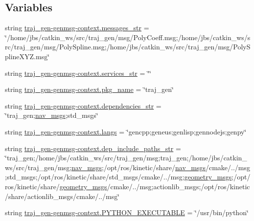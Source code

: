 \subsection*{Variables}
\begin{DoxyCompactItemize}
\item 
string \hyperlink{namespacetraj__gen-genmsg-context_aa35e0362011f87c9efa81944ad02a72c}{traj\+\_\+gen-\/genmsg-\/context.\+messages\+\_\+str} = \char`\"{}/home/jbs/catkin\+\_\+ws/src/traj\+\_\+gen/msg/Poly\+Coeff.\+msg;/home/jbs/catkin\+\_\+ws/src/traj\+\_\+gen/msg/Poly\+Spline.\+msg;/home/jbs/catkin\+\_\+ws/src/traj\+\_\+gen/msg/Poly\+Spline\+X\+Y\+Z.\+msg\char`\"{}
\item 
string \hyperlink{namespacetraj__gen-genmsg-context_a61b5ee79b98f6990ece4339523c314cd}{traj\+\_\+gen-\/genmsg-\/context.\+services\+\_\+str} = \char`\"{}\char`\"{}
\item 
string \hyperlink{namespacetraj__gen-genmsg-context_ab5dc5dad70851fcfb8bd37f81a8f57e1}{traj\+\_\+gen-\/genmsg-\/context.\+pkg\+\_\+name} = \char`\"{}traj\+\_\+gen\char`\"{}
\item 
string \hyperlink{namespacetraj__gen-genmsg-context_a417c691ecce226ef2afe434ec5853bcf}{traj\+\_\+gen-\/genmsg-\/context.\+dependencies\+\_\+str} = \char`\"{}traj\+\_\+gen;\hyperlink{_spline_gen_8js_a1fa5a20fd50395f7b988c134be2a3d32}{nav\+\_\+msgs};std\+\_\+msgs\char`\"{}
\item 
string \hyperlink{namespacetraj__gen-genmsg-context_aca02eb8fb1f15eb63943df387811ddd1}{traj\+\_\+gen-\/genmsg-\/context.\+langs} = \char`\"{}gencpp;geneus;genlisp;gennodejs;genpy\char`\"{}
\item 
string \hyperlink{namespacetraj__gen-genmsg-context_abb5ac73d6c4fb1f9bd9518957d727d36}{traj\+\_\+gen-\/genmsg-\/context.\+dep\+\_\+include\+\_\+paths\+\_\+str} = \char`\"{}traj\+\_\+gen;/home/jbs/catkin\+\_\+ws/src/traj\+\_\+gen/msg;traj\+\_\+gen;/home/jbs/catkin\+\_\+ws/src/traj\+\_\+gen/msg;\hyperlink{_spline_gen_8js_a1fa5a20fd50395f7b988c134be2a3d32}{nav\+\_\+msgs};/opt/ros/kinetic/share/\hyperlink{_spline_gen_8js_a1fa5a20fd50395f7b988c134be2a3d32}{nav\+\_\+msgs}/cmake/../msg;std\+\_\+msgs;/opt/ros/kinetic/share/std\+\_\+msgs/cmake/../msg;\hyperlink{_spline_gen_8js_a57147b325f221018e8a885cfdabacab8}{geometry\+\_\+msgs};/opt/ros/kinetic/share/\hyperlink{_spline_gen_8js_a57147b325f221018e8a885cfdabacab8}{geometry\+\_\+msgs}/cmake/../msg;actionlib\+\_\+msgs;/opt/ros/kinetic/share/actionlib\+\_\+msgs/cmake/../msg\char`\"{}
\item 
string \hyperlink{namespacetraj__gen-genmsg-context_a35a5b37a567194e82b36cfe55c253a92}{traj\+\_\+gen-\/genmsg-\/context.\+P\+Y\+T\+H\+O\+N\+\_\+\+E\+X\+E\+C\+U\+T\+A\+B\+LE} = \char`\"{}/usr/bin/python\char`\"{}

\end{DoxyCompactItemize}
